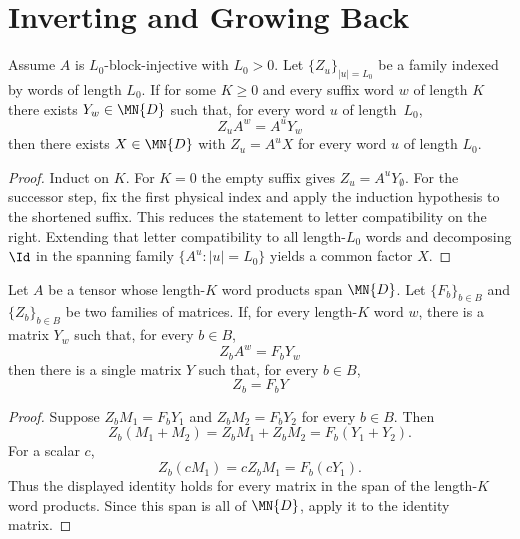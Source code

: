 \section{Inverting and Growing Back}\label{sec:block_word_stripping}

\begin{theorem}
    \label{thm:block_word_strip_right_factor}
    \leanok
    Assume $A$ is $L_0$-block-injective with $L_0 > 0$. Let $\{Z_u\}_{|u|=L_0}$
    be a family indexed by words of length $L_0$. If for some $K \ge 0$ and every
    suffix word $w$ of length $K$ there exists $Y_w \in \MN{D}$ such that,
    for every word $u$ of length~$L_0$,
    \[
        Z_u A^w = A^u Y_w
    \]
    then there exists $X \in \MN{D}$ with $Z_u = A^u X$ for every word $u$ of
    length $L_0$.
\end{theorem}

\begin{proof}
    \leanok
    Induct on $K$. For $K = 0$ the empty suffix gives $Z_u = A^u Y_{\emptyset}$.
    For the successor step, fix the first physical index and apply the induction
    hypothesis to the shortened suffix. This reduces the statement to letter
    compatibility on the right. Extending that letter compatibility to all
    length-$L_0$ words and decomposing $\Id$ in the spanning family
    $\{A^u : |u| = L_0\}$ yields a common factor $X$.
\end{proof}

\begin{theorem}
    \label{thm:word_span_common_boundary_matrix}
    \leanok
    Let $A$ be a tensor whose length-$K$ word products span $\MN{D}$. Let
    $\{F_b\}_{b\in B}$ and $\{Z_b\}_{b\in B}$ be two families of matrices. If,
    for every length-$K$ word $w$, there is a matrix $Y_w$ such that, for every
    \(b\in B\),
    \[
        Z_b A^w=F_bY_w
    \]
    then there is a single matrix $Y$ such that, for every \(b\in B\),
    \[
        Z_b=F_bY
    \]
\end{theorem}

\begin{proof}
    \leanok
    Suppose \(Z_bM_1=F_bY_1\) and \(Z_bM_2=F_bY_2\) for every \(b\in B\). Then
    \[
        Z_b(M_1+M_2)
        =
        Z_bM_1+Z_bM_2
        =
        F_b(Y_1+Y_2).
    \]
    For a scalar \(c\),
    \[
        Z_b(cM_1)
        =
        cZ_bM_1
        =
        F_b(cY_1).
    \]
    Thus the displayed identity holds for every matrix in the span of the
    length-\(K\) word products. Since this span is all of \(\MN{D}\), apply it
    to the identity matrix.
\end{proof}

